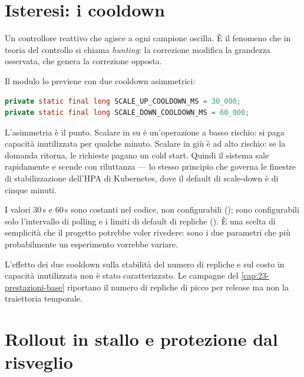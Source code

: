 \section{Isteresi: i cooldown}

Un controllore reattivo che agisce a ogni campione oscilla. \`E il fenomeno che
in teoria del controllo si chiama \emph{hunting}: la correzione modifica la
grandezza osservata, che genera la correzione opposta.

Il modulo lo previene con due cooldown asimmetrici:

\begin{lstlisting}[language=Java]
private static final long SCALE_UP_COOLDOWN_MS = 30_000;
private static final long SCALE_DOWN_COOLDOWN_MS = 60_000;
\end{lstlisting}

L'asimmetria \`e il punto. Scalare in su \`e un'operazione a basso rischio: si
paga capacit\`a inutilizzata per qualche minuto. Scalare in gi\`u \`e ad alto
rischio: se la domanda ritorna, le richieste pagano un cold start. Quindi il
sistema sale rapidamente e scende con riluttanza --- lo stesso principio che
governa le finestre di stabilizzazione dell'HPA di Kubernetes, dove il default di
scale-down \`e di cinque minuti.

I valori 30\,s e 60\,s sono costanti nel codice, non configurabili
(); sono configurabili solo l'intervallo di
polling e i limiti di default di repliche (). \`E una
scelta di semplicit\`a che il progetto potrebbe voler rivedere: sono i due
parametri che pi\`u probabilmente un esperimento vorrebbe variare.

\begin{damisurare}
L'effetto dei due cooldown sulla stabilit\`a del numero di repliche e sul costo
in capacit\`a inutilizzata non \`e stato caratterizzato. Le campagne del
\cref{cap:23-prestazioni-base} riportano il numero di repliche di picco per
release ma non la traiettoria temporale.
\end{damisurare}

\section{Rollout in stallo e protezione dal risveglio}

